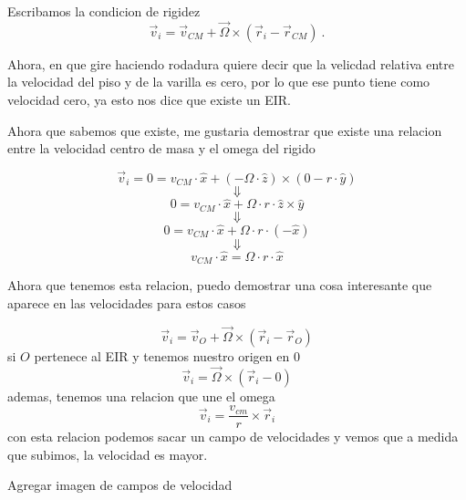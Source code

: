 \documentclass[../Main.tex]{subfiles}
\begin{document}
\npage{
}
{
    Escribamos la condicion de rigidez
    \begin{equation*}
    \vec{v}_{i} = \vec{v}_{CM} + \vec{\Omega} \times \left( \vec{r}_{i} - \vec{r}_{CM} \right) \ .
    \end{equation*}

    Ahora, en que gire haciendo rodadura quiere decir que la velicdad relativa
    entre la velocidad del piso y de la varilla es cero, por lo que ese punto tiene
    como velocidad cero, ya esto nos dice que existe un EIR.

    Ahora que sabemos que existe, me gustaria demostrar que existe una relacion
    entre la velocidad centro de masa y el omega del rigido

    \begin{equation*}
        \vec{v}_{i} = 0 = v_{CM} \cdot \hat{x} + \left( - \Omega \cdot \hat{z} \right) \times \left( 0 - r \cdot \hat{y} \right)
    \end{equation*}
    \begin{equation*}
        \Downarrow
    \end{equation*}
    \begin{equation*}
        0 = v_{CM} \cdot \hat{x} + \Omega \cdot r \cdot \hat{z} \times \hat{y}
    \end{equation*}
    \begin{equation*}
        \Downarrow
    \end{equation*}
    \begin{equation*}
        0 = v_{CM} \cdot \hat{x} + \Omega \cdot r \cdot \left( - \hat{x} \right)
    \end{equation*}
    \begin{equation*}
        \Downarrow
    \end{equation*}
    \begin{equation*}
        v_{CM} \cdot \hat{x} = \Omega \cdot r \cdot \hat{x}
    \end{equation*}

    Ahora que tenemos esta relacion, puedo demostrar una cosa interesante que
    aparece en las velocidades para estos casos 

    \begin{equation*}
        \vec{v}_{i} = \vec{v}_{O} + \vec{\Omega} \times \left( \vec{r}_{i} - \vec{r}_{O} \right)
    \end{equation*}
    si $O$ pertenece al EIR y tenemos nuestro origen en $0$
    \begin{equation*}
        \vec{v}_{i} = \vec{\Omega} \times \left( \vec{r}_{i} - 0 \right)
    \end{equation*}
    ademas, tenemos una relacion que une el omega
    \begin{equation*}
        \vec{v}_{i} = \frac{v_{cm}}{r} \times \vec{r}_{i}
    \end{equation*}
    con esta relacion podemos sacar un campo de velocidades y vemos que a medida
    que subimos, la velocidad es mayor.

    Agregar imagen de campos de velocidad

}
\end{document}
